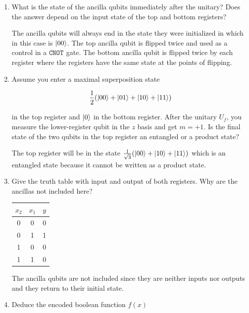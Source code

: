 \documentclass[12pt]{article}
\newcommand{\rsqrt}[1]{\ensuremath{\frac{1}{\sqrt{#1}}}}
\newenvironment{answer}{\begingroup\setlength{\leftskip}{-\leftmargin}\begin{framed}}{\end{framed}\endgroup}
\newcommand{\CNOT}[1]{\ensuremath{\texttt{CNOT}_{#1}}}
\begin{document}
\begin{enumerate}
	\item What is the state of the ancilla qubits immediately after the unitary? Does the answer depend on the input state of the top and bottom registers?

	\begin{answer}
		The ancilla qubits will always end in the state they were initialized in which in this case is $\ket{00}$. The top ancilla qubit is flipped twice and used as a control in a \CNOT{} gate. The bottom ancilla qubit is flipped twice by each register where the registers have the same state at the points of flipping. 
	\end{answer}

	\item Assume you enter a maximal superposition state

	\begin{align*}
		\frac{1}{2}(\ket{00} + \ket{01} + \ket{10} + \ket{11})
	\end{align*}

	in the top register and $\ket{0}$ in the bottom register. After the unitary $U_f$, you measure the lower-register qubit in the $z$ basis and get $m = +1$. Is the final state of the two qubits in the top register an entangled or a product state?

	\begin{answer}
		The top register will be in the state $\rsqrt{3}(\ket{00} + \ket{10} + \ket{11})$ which is an entangled state because it cannot be written as a product state. 
	\end{answer}

	\item Give the truth table with input and output of both registers. Why are the ancillas not included here?

	\begin{answer}
		\begin{tabular}{c c | c}
			$x_2$ & $x_1$ & $y$ \\
			\hline
			0 & 0 & 0 \\
			0 & 1 & 1 \\
			1 & 0 & 0 \\
			1 & 1 & 0 \\
		\end{tabular}
		The ancilla qubits are not included since they are neither inputs nor outputs and they return to their initial state. 
	\end{answer}

	\item Deduce the encoded boolean function $f(x)$


\end{enumerate}
\end{document}
